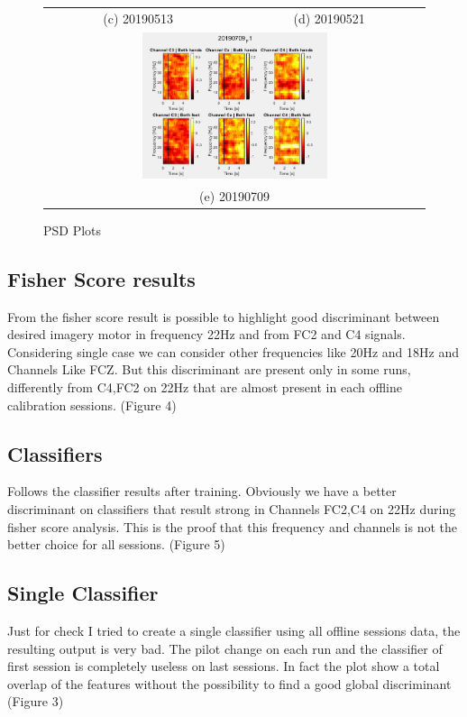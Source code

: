 \begin{figure}
\begin{tabular}{cc}
    (c) 20190513 & (d) 20190521 \\
    \multicolumn{2}{c}{\includegraphics[width=0.5\textwidth]{Figure/20190709_ERDERS.JPG} }\\
    \multicolumn{2}{c}{(e) 20190709}\\


\end{tabular}
\caption{PSD Plots}
\end{figure}

\subsection{Fisher Score results}\label{subsec:status}
From the fisher score result is possible to highlight good discriminant between desired imagery motor in frequency 22Hz and from FC2 and C4 signals. Considering single case we can consider other frequencies like 20Hz and 18Hz and Channels Like FCZ. But this discriminant are present only in some runs, differently from C4,FC2 on 22Hz that are almost present in each offline calibration sessions. (Figure 4)

\subsection{Classifiers}\label{subsec:status}
Follows the classifier results after training. Obviously we have a better discriminant on classifiers that result strong in Channels FC2,C4 on 22Hz during fisher score analysis. This is the proof that this frequency and channels is not the better choice for all sessions. (Figure 5)

\subsection{Single Classifier}\label{subsec:status}
Just for check I tried to create a single classifier using all offline sessions data, the resulting output is very bad. The pilot change on each run and the classifier of first session is completely useless on last sessions. In fact the plot show a total overlap of the features without the possibility to find a good global discriminant (Figure 3)

